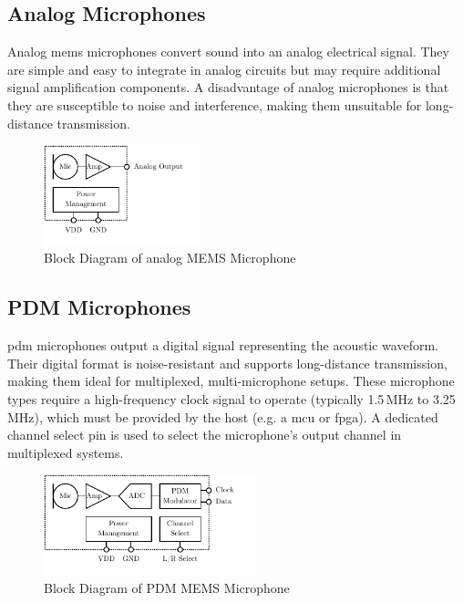 \subsection{Analog Microphones} \label{sec:analog_microphones}
Analog \acrshort{mems} microphones convert sound into an analog electrical signal.
They are simple and easy to integrate in analog circuits but may require additional signal amplification components.
A disadvantage of analog microphones is that they are susceptible to noise and interference, making them unsuitable for long-distance transmission.
\begin{figure}[h!]
	\centering
	\vspace{-0.1cm}
	\includegraphics[height=2.9cm, trim={0 0.4cm 0 0}]{images/2_preliminaries/mems_microphone_types_analog.pdf}
	\caption{Block Diagram of analog MEMS Microphone}
	\label{fig:mems_microphone_types_analog}
\end{figure}

\subsection{PDM Microphones} \label{sec:pdm_microphones}
\acrshort{pdm} microphones output a digital signal representing the acoustic waveform.
Their digital format is noise-resistant and supports long-distance transmission, making them ideal for multiplexed, multi-microphone setups.
These microphone types require a high-frequency clock signal to operate (typically 1.5\,MHz to 3.25\,MHz),
which must be provided by the host (e.g. a \acrshort{mcu} or \acrshort{fpga}).
A dedicated channel select pin is used to select the microphone's output channel in multiplexed systems.
\begin{figure}[h!]
	\centering
	\vspace{-0.1cm}
	\includegraphics[height=2.9cm, trim={0 0.4cm 0 0}]{images/2_preliminaries/mems_microphone_types_pdm.pdf}
	\caption{Block Diagram of PDM MEMS Microphone}
	\label{fig:mems_microphone_types_pdm}
\end{figure}

